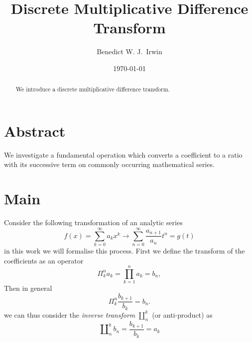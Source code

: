 \documentclass{article}
\title{Discrete Multiplicative Difference Transform}
\date{\today}
\begin{document}

\author[1,2]{Benedict W. J.~Irwin}


\maketitle
\begin{abstract}
We introduce a discrete multiplicative difference transform.
\end{abstract}

\section{Abstract}
We investigate a fundamental operation which converts a coefficient to a ratio with its successive term on commonly occurring mathematical series.

\section{Main}
Consider the following transformation of an analytic series
\begin{equation}
f(x)  = \sum_{k=0}^\infty a_k x^k \to \sum_{n=0}^\infty \frac{a_{n+1}}{a_{n}}t^n = g(t)
\end{equation}
in this work we will formalise this process. First we define the transform of the coefficients as an operator
\begin{equation}
\Pi_k^n a_k = \prod_{k=1}^n a_k = b_n,
\end{equation}
Then in general
\begin{equation}
\Pi_k^n \frac{b_{k+1}}{b_{k}} = b_n.
\end{equation}
we can thus consider the \emph{inverse transform} $\amalg_n^k$ (or anti-product) as
\begin{equation}
\amalg_n^k b_n = \frac{b_{k+1}}{b_{k}} = a_k
\end{equation}
\end{document}
